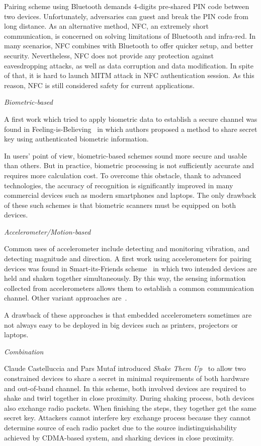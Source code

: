 Pairing scheme using Bluetooth demands 4-digits pre-shared PIN code between two devices. Unfortunately, adversaries can guest and break the PIN code from long distance. As an alternative method, NFC, an extremely short communication, is concerned on solving limitations of Bluetooth and infra-red. In many scenarios, NFC combines with Bluetooth to offer quicker setup, and better security. Nevertheless, NFC does not provide any protection against eavesdropping attacks, as well as data corruption and data modification. In spite of that, it is hard to launch MITM attack in NFC authentication session. As this reason, NFC is still considered safety for current applications. 

\emph{Biometric-based}

A first work which tried to apply biometric data to establish a secure channel was found in Feeling-is-Believing~\cite{Buhan_feelingis} in which authors proposed a method to share secret key using authenticated biometric information. 

In users' point of view, biometric-based schemes sound more secure and usable than others. But in practice, biometric processing is not sufficiently accurate and requires more calculation cost. To overcome this obstacle, thank to advanced technologies, the accuracy of recognition is significantly improved in many commercial devices such as modern smartphones and laptops. The only drawback of these such schemes is that biometric scanners must be equipped on both devices. 

\emph{Accelerometer/Motion-based}

Common uses of accelerometer include detecting and monitoring vibration, and detecting magnitude and direction. A first work using accelerometers for pairing devices was found in Smart-its-Friends scheme~\cite{Holmquist:2001kl} in which two intended devices are held and shaken together simultaneously. By this way, the sensing information collected from accelerometers allows them to establish a common communication channel. Other variant approaches are~\cite{Lester04areyou,Mayrhofer:2007oq,Studer:2011:DBS:2076732.2076780,Groza:2012:SSA:,Chong:2010:GUD:1851600.1851644, Chagnaadorj:2013aa}.

A drawback of these approaches is that embedded accelerometers sometimes are not always easy to be deployed in big devices such as printers, projectors or laptops.

\emph{Combination}

Claude Castelluccia and Pars Mutaf introduced \emph{Shake Them Up}~\cite{Castelluccia:2005} to allow two constrained devices to share a secret in minimal requirements of both hardware and out-of-band channel. In this scheme, both involved devices are required to shake and twirl together in close proximity. During shaking process, both devices also exchange radio packets. When finishing the steps, they together get the same secret key. Attackers cannot interfere key exchange process because they cannot determine source of each radio packet due to the source indistinguishability achieved by CDMA-based system, and sharking devices in close proximity. 

